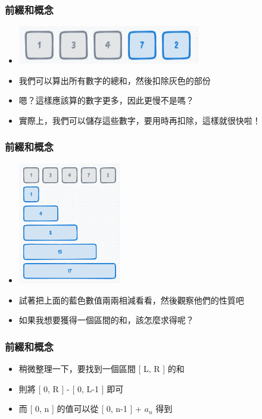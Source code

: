 \documentclass{beamer}
\begin{document}
\begin{frame}
    \frametitle{前綴和概念}
    \begin{itemize}
        \item \includegraphics[width=8.0cm]{img/img_7.png}
        \item 我們可以算出所有數字的總和，然後扣除灰色的部份
        \item<2-> 嗯？這樣應該算的數字更多，因此更慢不是嗎？
        \item<2-> 實際上，我們可以儲存這些數字，要用時再扣除，這樣就很快啦！
    \end{itemize}
\end{frame}

\begin{frame}
    \frametitle{前綴和概念}
    \begin{itemize}
        \item \includegraphics[width=4.5cm]{img/img_8.png}
        \item 試著把上面的藍色數值兩兩相減看看，然後觀察他們的性質吧
        \item 如果我想要獲得一個區間的和，該怎麼求得呢？
    \end{itemize}
\end{frame}

\begin{frame}
    \frametitle{前綴和概念}
    \begin{itemize}
        \item 稍微整理一下，要找到一個區間 [ L, R ] 的和
        \item 則將 [ 0, R ] - [ 0, L-1 ] 即可
        \item 而 [ 0, n ] 的值可以從 [ 0, n-1 ] + $a_n$ 得到
    \end{itemize}
\end{frame}
\end{document}
